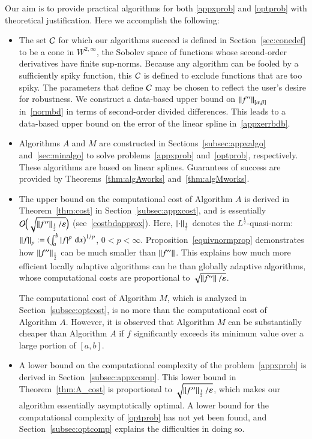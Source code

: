\documentclass[review]{elsarticle}
\newcommand{\abstol}{\varepsilon}
\theoremstyle{definition}
\renewcommand{\cw}{W}
\begin{document}
Our aim is to provide practical algorithms for both \eqref{appxprob} and
\eqref{optprob} with theoretical justification. Here we accomplish the
following:
\begin{itemize}

\item The set $\cc$ for which our algorithms succeed is defined in
Section~\ref{sec:conedef} to be a cone in $\cw^{2,\infty}$, the Sobolev space of
functions whose second-order derivatives have finite sup-norms. Because any
algorithm can be fooled by a sufficiently spiky function, this $\cc$ is defined
to exclude functions that are too spiky. The parameters that define $\cc$ may be
chosen to reflect the user's desire for robustness. We construct a data-based
upper bound on $\norm[{[\alpha,\beta]}]{f''}$ in~\eqref{normbd} in terms of
second-order divided differences. This leads to a data-based upper bound on the
error of the linear spline in~\eqref{appxerrbdb}.

\item Algorithms $A$ and $M$ are constructed in Sections~\ref{subsec:appxalgo}
and~\ref{sec:minalgo} to solve problems~\eqref{appxprob} and~\eqref{optprob},
respectively. These algorithms are based on linear splines. Guarantees of
success are provided by Theorems~\ref{thm:algAworks} and~\ref{thm:algMworks}.

\item The upper bound on the computational cost of Algorithm $A$ is derived in
Theorem~\ref{thm:cost} in Section~\ref{subsec:appxcost}, and is essentially
$\Order\Bigl(\sqrt{\norm[\frac12]{f''}/\abstol}\Bigr)$
(see~\eqref{costbdapprox}). Here, $\norm[\frac12]{\cdot}$ denotes the
$L^{\frac12}$-quasi-norm: $\norm[p]{f} := \bigl(\int_a^b \abs{f}^p \, \dif x
\bigr)^{1/p}$, $0 < p < \infty$. Proposition~\ref{equivnormprop} demonstrates
how $\norm[\frac12]{f''}$ can be much smaller than $\norm{f''}$. This explains
how much more efficient locally adaptive algorithms can be than globally
adaptive algorithms, whose computational costs are proportional to
$\sqrt{\norm{f''}/\abstol}$.

The computational cost of Algorithm $M$, which is analyzed in
Section~\ref{subsec:optcost}, is no more than the computational cost of
Algorithm $A$. However, it is observed that Algorithm $M$ can be substantially
cheaper than Algorithm $A$ if $f$ significantly exceeds its minimum value over a
large portion of $[a,b]$.

\item A lower bound on the computational complexity of the
problem~\eqref{appxprob} is derived in Section~\ref{subsec:appxcomp}. This lower
bound in Theorem~\ref{thm:A_cost} is proportional to
$\sqrt{\norm[\frac12]{f''}/\abstol}$, which makes our algorithm essentially
asymptotically optimal. A lower bound for the computational complexity of
\eqref{optprob} has not yet been found, and Section~\ref{subsec:optcomp}
explains the difficulties in doing so.


\end{itemize}
\end{document}
